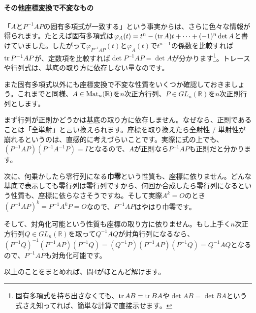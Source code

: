 \paragraph{その他座標変換で不変なもの}

「$A$と$P^{-1} A P$の固有多項式が一致する」という事実からは、さらに色々な情報が得られます。たとえば固有多項式は$\varphi_A(t) = t^n - (\operatorname{tr} A) t + \cdots + (-1)^n \det A$と書けていました。したがって$\varphi_{P^{-1} A P}(t)$と$\varphi_A(t)$で$t^{n - 1}$の係数を比較すれば$\operatorname{tr} P^{-1} A P$が、定数項を比較すれば$\det P^{-1} A P = \det A$が分かります\footnote{固有多項式を持ち出さなくても、$\operatorname{tr} AB = \operatorname{tr} BA$や$\det AB = \det BA$という式さえ知ってれば、簡単な計算で直接示せます。}。トレースや行列式は、基底の取り方に依存しない量なのです。

また固有多項式以外にも座標変換で不変な性質をいくつか確認しておきましょう。これまでと同様、$A \in \operatorname{Mat}_n(\mathbb{R})$を$n$次正方行列、$P \in GL_n(\mathbb{R})$を$n$次正則行列とします。

まず行列が正則かどうかは基底の取り方に依存しません。なぜなら、正則であることは「全単射」と言い換えられます。座標を取り換えたら全射性 / 単射性が崩れるというのは、直感的に考えづらいことです。実際に式の上でも、$(P^{-1} A P)(P^{-1} A^{-1} P) = I$となるので、$A$が正則なら$P^{-1} A P$も正則だと分かります。

次に、何乗かしたら零行列になる\textbf{巾零}という性質も、座標に依りません。どんな基底で表示しても零行列は零行列ですから、何回か合成したら零行列になるという性質も、座標に依らなさそうですね。そして実際$A^k = O$のとき$(P^{-1} A P)^k = P^{-1} A^k P = O$なので、$P^{-1} A P$はやはり巾零です。

そして、対角化可能という性質も座標の取り方に依りません。もし上手く$n$次正方行列$Q \in GL_n(\mathbb{R})$を取って$Q^{-1} A Q$が対角行列になるなら、$(P^{-1} Q)^{-1} (P^{-1} A P) (P^{-1} Q) = (Q^{-1} P) (P^{-1} A P) (P^{-1} Q) = Q^{-1} A Q$となるので、$P^{-1} A P$も対角化可能です。

以上のことをまとめれば、問4がほとんど解けます。

